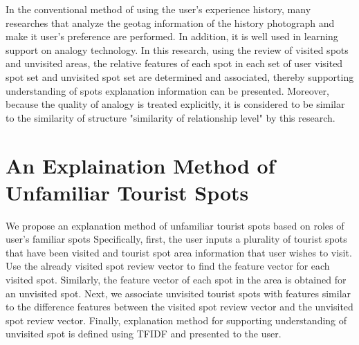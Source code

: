 \documentclass[journal]{IAENGtran}
\begin{document}
In the conventional method of using the user's experience history, many researches that analyze the geotag information of the history photograph and make it user's preference are performed.
In addition, it is well used in learning support on analogy technology.
In this research, using the review of visited spots and unvisited areas, the relative features of each spot in each set of user visited spot set and unvisited spot set are determined and associated, thereby supporting understanding of spots explanation information can be presented.
Moreover, because the quality of analogy is treated explicitly, it is considered to be similar to the similarity of structure "similarity of relationship level" by this research.


\section{An Explaination Method of Unfamiliar Tourist Spots}
\label{sec:An Explaination Method of Unfamiliar Tourist Spots}
We propose an explanation method of unfamiliar tourist spots based on roles of user’s familiar spots
Specifically, first, the user inputs a plurality of tourist spots that have been visited and tourist spot area information that user wishes to visit.
Use the already visited spot review vector to find the feature vector for each visited spot.
Similarly, the feature vector of each spot in the area is obtained for an unvisited spot.
Next, we associate unvisited tourist spots with features similar to the difference features between the visited spot review vector and the unvisited spot review vector.
Finally, explanation method for supporting understanding of unvisited spot is defined using TFIDF and presented to the user.
\end{document}

